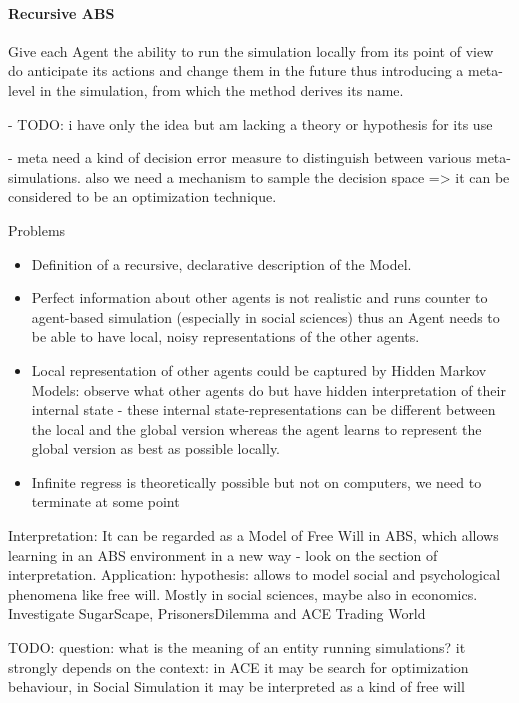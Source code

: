 \paragraph{Recursive ABS}
Give each  Agent the ability to run the simulation locally from its point of view do anticipate its actions and change them in the future thus introducing a meta-level in the simulation, from which the method derives its name.

- TODO:  i have only the idea but am lacking a theory or hypothesis for its use

- meta need a kind of decision error measure to distinguish between various meta-simulations. also we need a mechanism to sample the decision space => it can be considered to be an optimization technique.

Problems
\begin{itemize}
	\item Definition of a recursive, declarative description of the Model.
	\item Perfect information about other agents is not realistic and runs counter to agent-based simulation (especially in social sciences) thus an Agent needs to be able to have local, noisy representations of the other agents.
	\item Local representation of other agents could be captured by Hidden Markov Models: observe what other agents do but have hidden interpretation of their internal state - these internal state-representations can be different between the local and the global version whereas the agent learns to represent the global version as best as possible locally.
	\item Infinite regress is theoretically possible but not on computers, we need to terminate at some point
\end{itemize}

Interpretation: It can be regarded as a Model of Free Will in ABS, which allows learning in an ABS environment in a new way - look on the section of interpretation.
Application: hypothesis: allows to model social and psychological phenomena like free will. Mostly in social sciences, maybe also in economics. Investigate SugarScape, PrisonersDilemma and ACE Trading World

TODO: question: what is the meaning of an entity running simulations? it strongly depends on the context: in ACE it may be search for optimization behaviour, in Social Simulation it may be interpreted as a kind of free will

